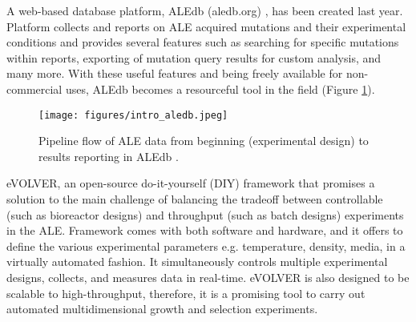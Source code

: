 A web-based database platform, ALEdb (aledb.org) \cite{phaneuf2019aledb}, has been created last year. Platform collects and reports on ALE acquired mutations and their experimental conditions and provides several features such as searching for specific mutations within reports, exporting of mutation query results for custom analysis, and many more. With these useful features and being freely available for non-commercial uses, ALEdb becomes a resourceful tool in the field (Figure \ref{fig:intro_aledb}).
\vspace{0.7cm}
  \begin{figure}[H]
  \begin{center}
  \texttt{[image: figures/intro\_aledb.jpeg]}
  \caption[Pipeline flow of ALE data from beginning (experimental design) to results reporting in ALEdb]{Pipeline flow of ALE data from beginning (experimental design) to results reporting in ALEdb \cite{phaneuf2019aledb}.}
  \label{fig:intro_aledb}
  \end{center}
\end{figure}
\vspace{-0.9cm}
eVOLVER\cite{wong2018precise}, an open-source do-it-yourself (DIY) framework that promises a solution to the main challenge of balancing the tradeoff between controllable (such as bioreactor designs) and throughput (such as batch designs) experiments in the ALE. Framework comes with both software and hardware, and it offers to define the various experimental parameters e.g. temperature, density, media, in a virtually automated fashion. It simultaneously controls multiple experimental designs, collects, and measures data in real-time. eVOLVER is also designed to be scalable to high-throughput, therefore, it is a promising tool to carry out automated multidimensional growth and selection experiments.


